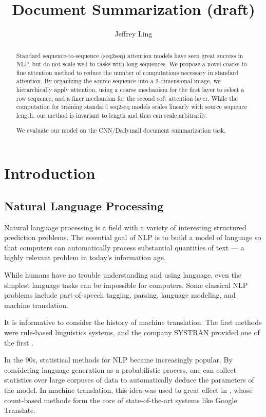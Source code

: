 \documentclass[11pt]{report}
\title{Document Summarization (draft)}
\author{Jeffrey Ling}
\begin{document}
\maketitle{}

\begin{abstract} %
Standard sequence-to-sequence (seq2seq) attention models have seen great success in NLP, but do not scale well to tasks with long sequences. We propose a novel coarse-to-fine attention method to reduce the number of computations necessary in standard attention. By organizing the source sequence into a 2-dimensional image, we hierarchically apply attention, using a coarse mechanism for the first layer to select a row sequence, and a finer mechanism for the second soft attention layer. While the computation for training standard seq2seq models scales linearly with source sequence length, our method is invariant to length and thus can scale arbitrarily.

We evaluate our model on the CNN/Dailymail document summarization task.
\end{abstract}

\tableofcontents{}




\chapter{Introduction}

\section{Natural Language Processing}

Natural language processing is a field with a variety of interesting structured prediction problems. The essential goal of NLP is to build a model of language so that computers can automatically process substantial quantities of text --- a highly relevant problem in today's information age.

While humans have no trouble understanding and using language, even the simplest language tasks can be impossible for computers. Some classical NLP problems include part-of-speech tagging, parsing, language modeling, and machine translation. %

It is informative to consider the history of machine translation. The first methods were rule-based linguistics systems, and the company SYSTRAN provided one of the first \citep{}.

In the 90s, statistical methods for NLP became increasingly popular. By considering language generation as a probabilistic process, one can collect statistics over large corpuses of data to automatically deduce the parameters of the model. In machine translation, this idea was used to great effect in \citet{Brown1993}, whose count-based methods form the core of state-of-the-art systems like Google Translate.
\end{document}
